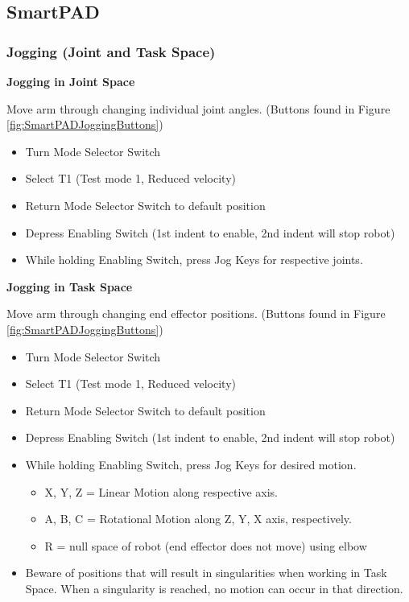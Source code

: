 \documentclass[12pt, letterpaper]{article}
\begin{document}
\subsection{SmartPAD}

\subsubsection{Jogging (Joint and Task Space)}


\textbf{Jogging in Joint Space} 

Move arm through changing individual joint angles. (Buttons found in Figure \ref{fig:SmartPADJoggingButtons})

\begin{itemize}
    \item Turn Mode Selector Switch
    \item Select T1 (Test mode 1, Reduced velocity)
    \item Return Mode Selector Switch to default position
    \item Depress Enabling Switch (1st indent to enable, 2nd indent will stop robot)
    \item While holding Enabling Switch, press Jog Keys for respective joints.
\end{itemize}

\textbf{Jogging in Task Space} 

Move arm through changing end effector positions. (Buttons found in Figure \ref{fig:SmartPADJoggingButtons})


\begin{itemize}
    \item Turn Mode Selector Switch
    \item Select T1 (Test mode 1, Reduced velocity)
    \item Return Mode Selector Switch to default position
    \item Depress Enabling Switch (1st indent to enable, 2nd indent will stop robot)
    \item While holding Enabling Switch, press Jog Keys for desired motion.
        \begin{itemize}
            \item X, Y, Z = Linear Motion along respective axis.
        \end{itemize}
        \begin{itemize}
            \item A, B, C = Rotational Motion along Z, Y, X axis, respectively.
        \end{itemize}
        \begin{itemize}
            \item R = null space of robot (end effector does not move) using elbow
        \end{itemize}
    \item Beware of positions that will result in singularities when working in Task Space. When a singularity is reached, no motion can occur in that direction. 
\end{itemize}
\end{document}
